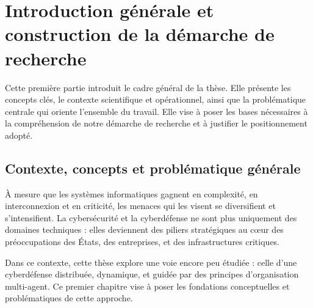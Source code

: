 \documentclass[ twoside,openright,titlepage,numbers=noenddot,headinclude,%
                footinclude=true,cleardoublepage=empty,abstractoff, %
                BCOR=5mm,paper=a4,fontsize=11pt,%
                french,american,%
                ]{scrreprt}
\begin{document}
\frenchspacing
\raggedbottom
{} %
\pagestyle{plain}




\cleardoublepage
\cleardoublepage

\cleardoublepage 
\pagestyle{scrheadings}
\cleardoublepage 

\cleardoublepage{}
\cleardoublepage


\part{Introduction générale et construction de la démarche de recherche}

\noindent
Cette première partie introduit le cadre général de la thèse. Elle présente les concepts clés, le contexte scientifique et opérationnel, ainsi que la problématique centrale qui oriente l'ensemble du travail. Elle vise à poser les bases nécessaires à la compréhension de notre démarche de recherche et à justifier le positionnement adopté.

\chapter{Contexte, concepts et problématique générale}

\noindent
À mesure que les systèmes informatiques gagnent en complexité, en interconnexion et en criticité, les menaces qui les visent se diversifient et s'intensifient. La cybersécurité et la cyberdéfense ne sont plus uniquement des domaines techniques : elles deviennent des piliers stratégiques au cœur des préoccupations des États, des entreprises, et des infrastructures critiques.

Dans ce contexte, cette thèse explore une voie encore peu étudiée : celle d'une cyberdéfense distribuée, dynamique, et guidée par des principes d'organisation multi-agent. Ce premier chapitre vise à poser les fondations conceptuelles et problématiques de cette approche.
\end{document}
